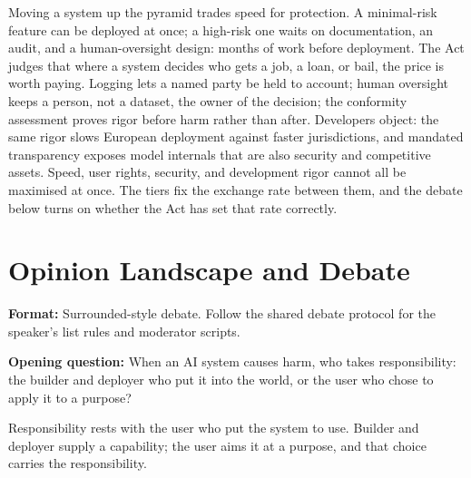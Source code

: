 
 Moving a system up the pyramid trades
speed for protection. A minimal-risk feature can be deployed at once; a
high-risk one waits on documentation, an audit, and a human-oversight
design: months of work before deployment. The Act judges that where a
system decides who gets a job, a loan, or bail, the price is worth paying.
Logging lets a named party be held to account; human oversight keeps a
person, not a dataset, the owner of the decision; the conformity assessment
proves rigor before harm rather than after. Developers object: the same
rigor slows European deployment against faster
jurisdictions, and mandated transparency exposes model internals that are
also security and competitive assets. Speed, user rights, security, and
development rigor cannot all be maximised at once. The tiers fix the
exchange rate between them, and the debate below turns on whether the Act
has set that rate correctly.

\section*{Opinion Landscape and Debate}

\noindent \textbf{Format:} Surrounded-style debate. Follow the shared
debate protocol for the speaker's list rules and moderator scripts.

\medskip
\noindent \textbf{Opening question:} When an AI system causes harm, who
takes responsibility: the builder and deployer who put it into the world,
or the user who chose to apply it to a purpose?


\quad Responsibility rests
with the user who put the system to use. Builder and deployer supply a
capability; the user aims it at a purpose, and that choice carries the
responsibility.
\vspace{1.5em}


